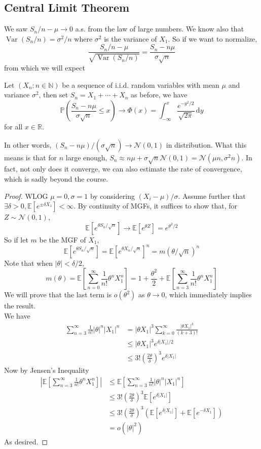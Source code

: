 \subsection{Central Limit Theorem}
We saw $S_n/n-\mu\to 0$ a.s. from the law of large numbers.
We know also that $\operatorname{Var}(S_n/n)=\sigma^2/n$ where $\sigma^2$ is the variance of $X_1$.
So if we want to normalize,
$$\frac{S_n/n-\mu}{\sqrt{\operatorname{Var}(S_n/n)}}=\frac{S_n-n\mu}{\sigma\sqrt{n}}$$
from which we will expect
\begin{theorem}
    Let $(X_n:n\in\mathbb N)$ be a sequence of i.i.d. random variables with mean $\mu$ and variance $\sigma^2$, then set $S_n=X_1+\cdots+X_n$ as before, we have
    $$\mathbb P\left( \frac{S_n-n\mu}{\sigma\sqrt{n}}\le x \right)\to\Phi(x)=\int_{-\infty}^x\frac{e^{-y^2/2}}{\sqrt{2\pi}}\,\mathrm dy$$
    for all $x\in\mathbb R$.
\end{theorem}
In other words, $(S_n-n\mu)/(\sigma\sqrt{n})\to\mathcal N(0,1)$ in distribution.
What this means is that for $n$ large enough, $S_n\approx n\mu+\sigma\sqrt{n}\mathcal N(0,1)=\mathcal N(\mu n,\sigma^2n)$.
In fact, not only does it converge, we can also estimate the rate of convergence, which is sadly beyond the course.
\begin{proof}
    WLOG $\mu=0,\sigma=1$ by considering $(X_i-\mu)/\sigma$.
    Assume further that $\exists\delta>0,\mathbb E[e^{\pm\delta X_1}]<\infty$.
    By continuity of MGFs, it suffices to show that, for $Z\sim\mathcal N(0,1)$,
    $$\mathbb E[e^{\theta S_n/\sqrt{n}}]\to\mathbb E[e^{\theta Z}]=e^{\theta^2/2}$$
    So if let $m$ be the MGF of $X_1$,
    $$\mathbb E[e^{\theta S_n/\sqrt{n}}]=\mathbb E[e^{\theta X_n/\sqrt{n}}]^n=m(\theta/\sqrt{n})^n$$
    Note that when $|\theta|<\delta/2$,
    $$m(\theta)=\mathbb E\left[ \sum_{n=0}^\infty\frac{1}{n!}\theta^nX_1^n \right]=1+\frac{\theta^2}{2}+\mathbb E\left[  \sum_{n=3}^\infty\frac{1}{n!}\theta^nX_1^n \right]$$
    We will prove that the last term is $o(\theta^2)$ as $\theta\to 0$, which immediately implies the result.\\
    We have
    \begin{align*}
        \sum_{n=3}^\infty\frac{1}{n!}|\theta|^n|X_1|^n&=|\theta X_1|^3\sum_{k=0}^\infty\frac{|\theta X_1|^k}{(k+3)!}\\
        &\le|\theta X_1|^3e^{\delta|X_1|/2}\\
        &\le 3!\left( \frac{2\theta}{\delta} \right)^3e^{\delta|X_1|}
    \end{align*}
    Now by Jensen's Inequality
    \begin{align*}
        \left|\mathbb E\left[  \sum_{n=3}^\infty\frac{1}{n!}\theta^nX_1^n \right]\right|&\le\mathbb E\left[ \sum_{n=3}^\infty\frac{1}{n!}|\theta|^n|X_1|^n \right]\\
        &\le 3!\left( \frac{2\theta}{\delta} \right)^3\mathbb E[e^{\delta|X_1|}]\\
        &\le 3!\left( \frac{2\theta}{\delta} \right)^3(\mathbb E[e^{\delta|X_1|}]+\mathbb E[e^{-\delta X_1}])\\
        &=o(|\theta|^2)
    \end{align*}
    As desired.
\end{proof}
